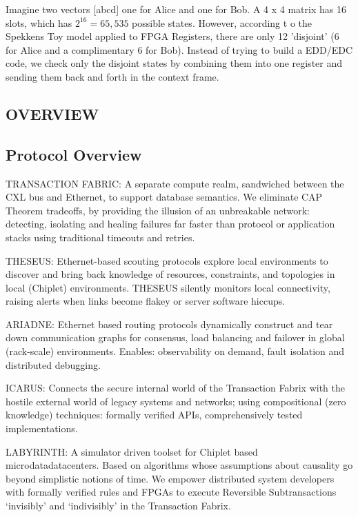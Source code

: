 \documentclass[../OAE-SPEC-MAIN.tex]{subfiles}
\begin{document}
Imagine two vectors [abcd] one for Alice and one for Bob. A 4 x 4 matrix has 16 slots, which has $2^{16} = 65,535$ possible states. However, according t o the Spekkens Toy model applied to FPGA Registers, there are only 12 'disjoint' (6 for Alice and a complimentary 6 for Bob). Instead of trying to build a EDD/EDC code, we check only the disjoint states by combining them into one register and sending them back and forth in the context frame.



\subsection{OVERVIEW}

\subsection{Protocol Overview}
\begin{description}
\item TRANSACTION FABRIC: A separate compute realm, sandwiched between the CXL bus and Ethernet, to support database semantics. We eliminate CAP Theorem tradeoffs, by providing the illusion of an unbreakable network: detecting, isolating and healing failures far faster than protocol or application stacks using traditional timeouts and retries.

\item THESEUS: Ethernet-based scouting protocols explore local environments to discover and bring back knowledge of resources, constraints, and topologies in local (Chiplet) environments. THESEUS silently monitors local connectivity, raising alerts when links become flakey or server software hiccups.

\item ARIADNE: Ethernet based routing protocols dynamically construct and tear down communication graphs for consensus, load balancing and failover in global (rack-scale) environments. Enables: observability on demand, fault isolation and distributed debugging.

\item ICARUS: Connects the secure internal world of the Transaction Fabrix with the hostile external world of legacy systems and networks; using compositional (zero knowledge) techniques: formally verified APIs, comprehensively tested implementations.

\item LABYRINTH: A simulator driven toolset for Chiplet based microdatadatacenters. Based on algorithms whose assumptions about causality go beyond simplistic notions of time. We empower distributed system developers with formally verified rules and FPGAs to execute Reversible Subtransactions ‘invisibly’ and ‘indivisibly’ in the Transaction Fabrix. 

\end{description}
\end{document}
